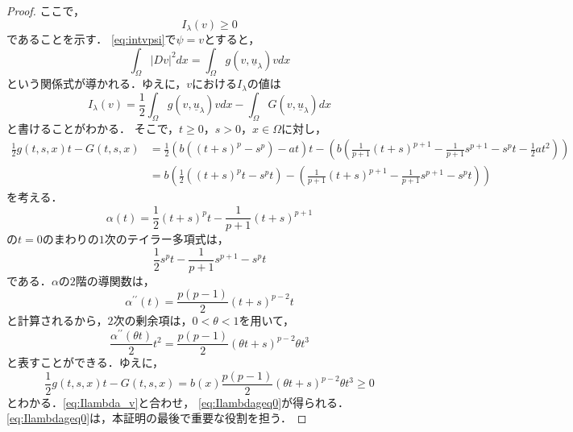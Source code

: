 \begin{proof}
 ここで，
 \begin{equation}
  I_\lambda(v) \geq 0 \label{eq:Ilambdageq0}
 \end{equation}
 であることを示す．
 \eqref{eq:intvpsi}で$\psi = v$とすると，
 \begin{equation}
  \int_\Omega \lvert Dv \rvert^2 dx = \int_\Omega g(v,
   \underline{u}_\lambda)v dx \label{eq:v_kankei}
 \end{equation}
 という関係式が導かれる．ゆえに，$v$における$I_\lambda$の値は
 \begin{equation}
  I_\lambda (v) = \frac{1}{2} \int_\Omega g(v, \underline{u}_\lambda)
   v dx - \int_\Omega G(v, \underline{u}_\lambda) dx \label{eq:Ilambda_v}
 \end{equation}
 と書けることがわかる．
 そこで，$t \geq 0$，$s > 0$，$x \in \Omega$に対し，
 \begin{align*}
  \frac{1}{2} g(t, s, x) t - G(t, s, x) &= \frac{1}{2} \left(b \left(
  (t+s)^p - s^p \right) -at \right)t - \left( b \left(
  \frac{1}{p+1}(t+s)^{p+1} - \frac{1}{p+1}s^{p+1} - s^p t -
  \frac{1}{2}at^2  \right) \right) \\
  &= b \left( \frac{1}{2} \left( (t+s)^pt - s^pt \right) -\left(
  \frac{1}{p+1} (t+s)^{p+1} - \frac{1}{p+1} s^{p+1} - s^p t \right) \right)
 \end{align*}
 を考える．
 \[
  \alpha(t) = \frac{1}{2} (t+s)^p t - \frac{1}{p+1}(t+s)^{p+1}
 \]
 の$t = 0$のまわりの$1$次のテイラー多項式は，
 \[
  \frac{1}{2} s^p t - \frac{1}{p+1}s^{p+1} - s^p t
 \]
 である．$\alpha$の$2$階の導関数は，
 \[
  \alpha^{\prime\prime}(t) = \frac{p(p-1)}{2}(t+s)^{p-2}t
 \]
 と計算されるから，$2$次の剰余項は，$0 < \theta < 1$を用いて，
 \[
  \frac{\alpha^{\prime\prime}(\theta t)}{2} t^2 =
 \frac{p(p-1)}{2}(\theta t + s)^{p-2} \theta t^3
 \]
 と表すことができる．ゆえに，
 \[
  \frac{1}{2} g(t, s, x)t - G(t, s, x) = b(x) \frac{p(p-1)}{2} (\theta
 t + s)^{p-2} \theta t^3 \geq 0
 \]
 とわかる．\eqref{eq:Ilambda_v}と合わせ，
 \eqref{eq:Ilambdageq0}が得られる．
 \eqref{eq:Ilambdageq0}は，本証明の最後で重要な役割を担う．


\end{proof}
